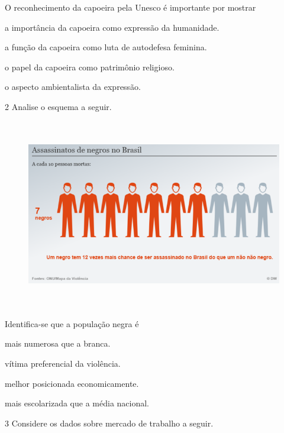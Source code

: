O reconhecimento da capoeira pela Unesco é importante por mostrar

\begin{escolha}
\item
  a importância da capoeira como expressão da humanidade.
\item
  a função da capoeira como luta de autodefesa feminina.
\item
  o papel da capoeira como patrimônio religioso.
\item
  o aspecto ambientalista da expressão.
\end{escolha}


\num{2} Analise o esquema a seguir.

\begin{figure}
\centering
\includegraphics[width=5.90556in,height=3.27708in]{./imgSAEB_9_CHUM3/media/image2.png}
\end{figure}

Identifica-se que a população negra é

\begin{escolha}
\item
  mais numerosa que a branca.
\item
  vítima preferencial da violência.
\item
  melhor posicionada economicamente.
\item
  mais escolarizada que a média nacional.
\end{escolha}

\num{3} Considere os dados sobre mercado de trabalho a seguir.


